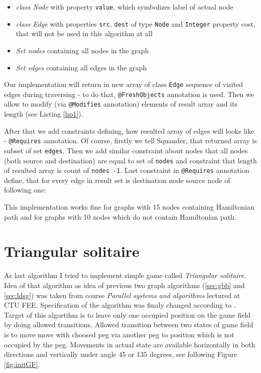 \documentclass[11pt,twoside,a4paper]{book}
\begin{document}
\begin{itemize}
  \item \textit{class Node} with property \verb|value|, which symbolizes label
  of actual node
  \item \textit{class Edge} with properties \verb|src|, \verb|dest| of type
  \verb|Node| and \verb|Integer| property cost, that will not be used in this
  algorithm at all
  \item \textit{Set nodes} containing all nodes in the graph
	\item \textit{Set edges} containing all edges in the graph
\end{itemize}

Our implementation will return in new array of class \verb|Edge| sequence of
visited edges during traversing - to do that, \verb|@FreshObjects| annotation is
used. Then we allow to modify (via \verb|@Modifies| annotation) elements of
result array and its length (see Listing \ref{hp1}).



After that we add constraints defining, how resulted array of edges will looks
like - \verb|@Requires| annotation. Of course, firstly we tell Squander, that
returned array is subset of set \verb|edges|. Then we add similar constraint about nodes that all nodes
(both source and destination) are equal to set of \verb|nodes| and constraint
that length of resulted array is count of \verb|nodes -1|. Last constraint in
\verb|@Requires| annotation define, that for every edge in result set is
destination node source node of following one:



This implementation works fine for graphs with 15 nodes containing Hamiltonian
path and for graphs with 10 nodes which do not contain Hamiltonian path.

\section{Triangular solitaire}
As last algorithm I tried to implement simple game called  \textit{Triangular
solitaire}. Idea of that algorithm as idea of previous two graph
algorithms (\ref{sec:gbb} and \ref{sec:ldsg}) was taken from course
\textit{Parallel systems and algorithms} lectured at CTU FEE. Specification of
the algorithm was finaly changed according to \cite{web:mathIsFun}. Target of
this algortihm is to leave only one occupied position on the game field by doing
allowed transitions. Allowed transition between two states of game field is to
move move with choosed peg via another peg to position which is not occupied by
the peg. Movements in actual state are available horizontally in both directions
and vertically under angle 45 or 135 degrees, see following Figure
\ref{fig:initGF}.
\end{document}
